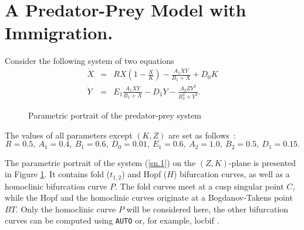 \documentclass[12pt]{report}
\begin{document}
\section{ A Predator-Prey Model with Immigration.}
Consider the following system of two equations \cite{Sc:95}
\begin{equation} \label{sn.1} \begin{array}{rcl}
\dot{X} & = & RX\left(1-{\frac{X}{K}}\right) - 
{\frac{A_1XY}{B_1+X}} + D_0K \\
\dot{Y} & = & E_1 { \frac{A_1XY}{B_1+X}} - D_1Y - 
{\frac{A_2ZY^2}{B_2^2+Y^2}}.
\end{array} \end{equation}
\begin{figure}[b]
\epsfysize 10.0cm
\centerline{}
\caption{Parametric portrait of the predator-prey system }
\label{SNF.1}
\end{figure}
The values of all parameters except $(K,Z)$ are set as follows~:
$$
R=0.5,\ A_1=0.4,\ B_1=0.6,\ D_0=0.01,\ E_1=0.6,\ A_2=1.0,\ B_2=0.5,\ D_1=0.15.
$$
\par
\noindent
The parametric portrait of the system (\ref{sn.1}) on the
$(Z,K)$-plane is presented in Figure \ref{SNF.1}. It contains fold
($t_{1,2}$) and Hopf ($H$) bifurcation curves, as well as a homoclinic
bifurcation curve $P$. The fold curves meet at a cusp singular point
$C$, while the Hopf and the homoclinic curves originate at a
Bogdanov-Takens point $BT$. Only the homoclinic curve $P$ will be 
considered here, the other bifurcation curves can be computed using
{\tt AUTO} or,
for example, {\cal locbif} \cite{KhKuLeNi:93}.
\end{document}
